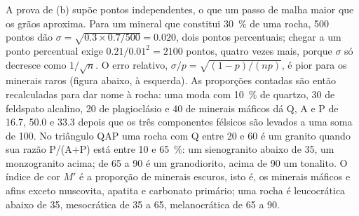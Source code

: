 A prova de (b) supõe pontos independentes, o que um passo de malha maior que os grãos
aproxima. Para um mineral que constitui \qty{30}{\percent} de uma rocha, 500 pontos dão $\sigma =
\sqrt{0.3 \times 0.7/500} = 0.020$, dois pontos percentuais; chegar a um ponto percentual exige
$0.21/0.01^2 = 2100$ pontos, quatro vezes mais, porque $\sigma$ só decresce como $1/\sqrt n$. O
erro relativo, $\sigma/p = \sqrt{(1-p)/(np)}$, é pior para os minerais raros (figura abaixo,
à esquerda). As proporções contadas são então recalculadas para dar nome à rocha: uma moda com
\qty{10}{\percent} de quartzo, 30 de feldspato alcalino, 20 de plagioclásio e 40 de minerais máficos dá Q, A e
P de 16.7, 50.0 e 33.3 depois que os três componentes félsicos são levados a uma soma de 100. No triângulo
QAP uma rocha com Q entre 20 e 60 é um granito quando sua razão P/(A+P) está entre 10 e
\qty{65}{\percent}: um sienogranito abaixo de 35, um monzogranito acima; de 65 a 90 é um
granodiorito, acima de 90 um tonalito. O índice de cor $M'$ é a proporção de minerais escuros, isto
é, os minerais máficos e afins exceto muscovita, apatita e carbonato primário; uma rocha é
leucocrática abaixo de 35, mesocrática de 35 a 65, melanocrática de 65 a 90.

